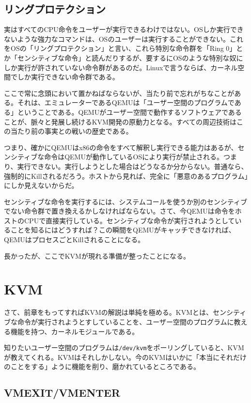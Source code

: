 ﻿\documentclass[9pt,b5paper,tombo,openany]{jsbook}
\begin{document}
\subsection{リングプロテクション}

実はすべてのCPU命令をユーザーが実行できるわけではない。OSしか実行できないような強力なコマンドは、OSのユーザーは実行することができない。これをOSの「リングプロテクション」と言い、これら特別な命令群を「Ring 0」とか「センシティブな命令」と読んだりするが、要するにOSのような特別な奴にしか実行が許されていない命令群があるのだ。Linuxで言うならば、カーネル空間でしか実行できない命令群である。

ここで常に念頭において置かねばならないが、当たり前で忘れがちなことがある。それは、エミュレーターであるQEMUは「ユーザー空間のプログラムである」ということである。QEMUがユーザー空間で動作するソフトウェアであることが、脈々と発展し続けるKVM開発の原動力となる。すべての周辺技術はこの当たり前の事実との戦いの歴史である。

つまり、確かにQEMUはx86の命令をすべて解釈し実行できる能力はあるが、センシティブな命令はQEMUが動作しているOSにより実行が禁止される。つまり、実行できない。実行しようとした場合はどうなるか分からない。普通なら、強制的にKillされるだろう。ホストから見れば、完全に「悪意のあるプログラム」にしか見えないからだ。

センシティブな命令を実行するには、システムコールを使うか別のセンシティブでない命令群で置き換えるかしなければならない。さて、今QEMUは命令をホストのCPUで直接実行している。センシティブな命令が実行されようとしていることを知るにはどうすれば？この瞬間をQEMUがキャッチできなければ、QEMUはプロセスごとKillされることになる。

長かったが、ここでKVMが現れる準備が整ったことになる。

\section{KVM}

さて、前章をもってすればKVMの解説は単純を極める。KVMとは、センシティブな命令が実行されようとすしていることを、ユーザー空間のプログラムに教える機能を持つ、カーネルモジュールである。

知りたいユーザー空間のプログラムは\verb|/dev/kvm|をポーリングしていると、KVMが教えてくれる。KVMはそれしかしない。今のKVMはいかに「本当にそれだけのことをする」ように機能を削り、磨かれているところである。

\subsection{VMEXIT/VMENTER}
\end{document}
